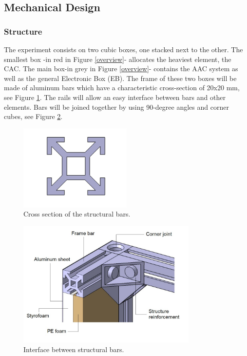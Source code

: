 \pagebreak
\subsection{Mechanical Design} \label{Mechanical_Design}


\subsubsection{Structure}

The experiment consists on two cubic boxes, one stacked next to the other. The smallest box -in red in Figure \ref{overview}- allocates the heaviest element, the CAC. The main box-in grey in Figure \ref{overview}- contains the AAC system as well as the general Electronic Box (EB). The frame of these two boxes will be made of aluminum bars which have a characteristic cross-section of 20x20 mm, see Figure \ref{cross-section}. The rails will allow an easy interface between bars and other elements. Bars will be joined together by using 90-degree angles and corner cubes, see Figure \ref{3_bars_joined}.


\begin{figure}[!ht]
    \centering
    \includegraphics[width=0.5\textwidth]{4-experiment-design/img/1_cross_section.jpg}
    \caption{Cross section of the structural bars.}
    \label{cross-section}
\end{figure}


\begin{figure}[!ht]
    \centering
    \includegraphics[width=0.8\textwidth]{4-experiment-design/img/structure_cut_name.jpg}
    \caption{Interface between structural bars.}
    \label{3_bars_joined}
\end{figure}

